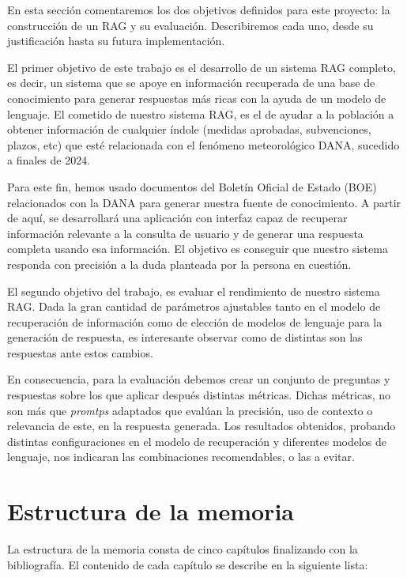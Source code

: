 	En esta sección comentaremos los dos objetivos definidos para este proyecto: la construcción de un RAG y su evaluación. Describiremos cada uno, desde su justificación hasta su futura implementación.
	
	\noindent El primer objetivo de este trabajo es el desarrollo de un sistema RAG completo, es decir, un sistema que se apoye en información recuperada de una base de conocimiento para generar respuestas más ricas con la ayuda de un modelo de lenguaje. El cometido de nuestro sistema RAG, es el de ayudar a la población a obtener información de cualquier índole (medidas aprobadas, subvenciones, plazos, etc) que esté relacionada con el fenómeno meteorológico DANA, sucedido a finales de 2024.	
	
	\noindent Para este fin, hemos usado documentos del Boletín Oficial de Estado (BOE) relacionados con la DANA para generar nuestra fuente de conocimiento. A partir de aquí, se desarrollará una aplicación con interfaz capaz de recuperar información relevante a la consulta de usuario y de generar una respuesta completa usando esa información. El objetivo es conseguir que nuestro sistema responda con precisión a la duda planteada por la persona en cuestión.
	
	\noindent El segundo objetivo del trabajo, es evaluar el rendimiento de nuestro sistema RAG. Dada la gran cantidad de parámetros ajustables tanto en el modelo de recuperación de información como de elección de modelos de lenguaje para la generación de respuesta, es interesante observar como de distintas son las respuestas ante estos cambios.
	
	\noindent En consecuencia, para la evaluación debemos crear un conjunto de preguntas y respuestas sobre los que aplicar después distintas métricas. Dichas métricas, no son más que \textit{promtps} adaptados que evalúan la precisión, uso de contexto o relevancia de este, en la respuesta generada. Los resultados obtenidos, probando distintas configuraciones en el modelo de recuperación y diferentes modelos de lenguaje, nos indicaran las combinaciones recomendables, o las a evitar.

\section{Estructura de la memoria}

	La estructura de la memoria consta de cinco capítulos finalizando con la bibliografía. El contenido de cada capítulo se describe en la siguiente lista:
	
